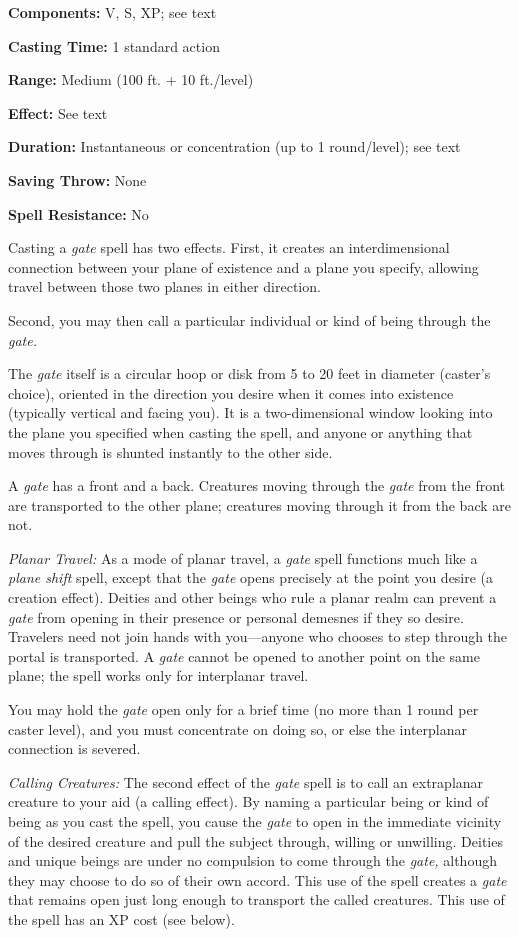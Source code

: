 \documentclass{article}
\begin{document}
\textbf{Components:} V, S, XP; see text

\textbf{Casting Time:} 1 standard action

\textbf{Range: }Medium (100 ft. + 10 ft./level)

\textbf{Effect:} See text

\textbf{Duration:} Instantaneous or concentration (up to 1 round/level); see text

\textbf{Saving Throw:} None

\textbf{Spell Resistance:} No

Casting a \textit{gate }spell has two effects. First, it creates an interdimensional 
connection between your plane of existence and a plane you specify, allowing travel 
between those two planes in either direction.

Second, you may then call a particular individual or kind of being through the 
\textit{gate.}

The \textit{gate }itself is a circular hoop or disk from 5 to 20 feet in diameter 
(caster's choice), oriented in the direction you desire when it comes into existence 
(typically vertical and facing you). It is a two-dimensional window looking into 
the plane you specified when casting the spell, and anyone or anything that moves 
through is shunted instantly to the other side.

A \textit{gate }has a front and a back. Creatures moving through the \textit{gate 
}from the front are transported to the other plane; creatures moving through it 
from the back are not.

\textit{Planar Travel: }As a mode of planar travel, a \textit{gate }spell functions 
much like a \textit{plane shift }spell, except that the \textit{gate }opens precisely 
at the point you desire (a creation effect). Deities and other beings who rule 
a planar realm can prevent a \textit{gate }from opening in their presence or personal 
demesnes if they so desire. Travelers need not join hands with you---anyone who 
chooses to step through the portal is transported. A \textit{gate }cannot be opened 
to another point on the same plane; the spell works only for interplanar travel.

You may hold the \textit{gate }open only for a brief time (no more than 1 round 
per caster level), and you must concentrate on doing so, or else the interplanar 
connection is severed.

\textit{Calling Creatures: }The second effect of the \textit{gate }spell is to 
call an extraplanar creature to your aid (a calling effect). By naming a particular 
being or kind of being as you cast the spell, you cause the \textit{gate }to open 
in the immediate vicinity of the desired creature and pull the subject through, 
willing or unwilling. Deities and unique beings are under no compulsion to come 
through the \textit{gate, }although they may choose to do so of their own accord. 
This use of the spell creates a \textit{gate }that remains open just long enough 
to transport the called creatures. This use of the spell has an XP cost (see below).
\end{document}
